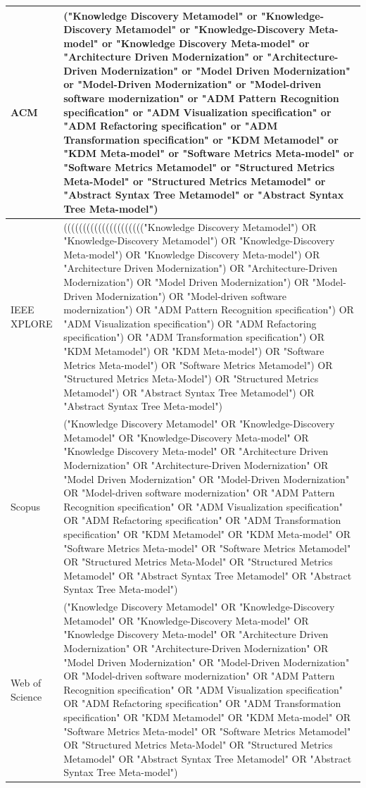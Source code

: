 \begin{longtable}[!tb]{ | m{2cm} | m{12cm}| }
 ACM & ("Knowledge Discovery Metamodel" or "Knowledge-Discovery Metamodel" or "Knowledge-Discovery Meta-model" or "Knowledge Discovery Meta-model" or "Architecture Driven Modernization" or "Architecture-Driven Modernization" or "Model Driven Modernization" or "Model-Driven Modernization" or "Model-driven software modernization" or "ADM Pattern Recognition specification" or "ADM Visualization specification" or "ADM Refactoring specification" or "ADM Transformation specification" or "KDM Metamodel" or "KDM Meta-model" or "Software Metrics Meta-model" or "Software Metrics Metamodel" or "Structured Metrics Meta-Model" or "Structured Metrics Metamodel" or "Abstract Syntax Tree Metamodel" or "Abstract Syntax Tree Meta-model")\\
 \hline
 IEEE XPLORE & ((((((((((((((((((((("Knowledge Discovery Metamodel") OR "Knowledge-Discovery Metamodel") OR "Knowledge-Discovery Meta-model") OR "Knowledge Discovery Meta-model") OR "Architecture Driven Modernization") OR "Architecture-Driven Modernization") OR "Model Driven Modernization") OR "Model-Driven Modernization") OR "Model-driven software modernization") OR "ADM Pattern Recognition specification") OR "ADM Visualization specification") OR "ADM Refactoring specification") OR "ADM Transformation specification") OR "KDM Metamodel") OR "KDM Meta-model") OR "Software Metrics Meta-model") OR "Software Metrics Metamodel") OR "Structured Metrics Meta-Model") OR "Structured Metrics Metamodel") OR "Abstract Syntax Tree Metamodel") OR "Abstract Syntax Tree Meta-model")\\
 \hline
 Scopus & ("Knowledge Discovery Metamodel"  OR  "Knowledge-Discovery Metamodel"  OR  "Knowledge-Discovery Meta-model"  OR  "Knowledge Discovery Meta-model"  OR  "Architecture Driven Modernization" OR  "Architecture-Driven Modernization"  OR  "Model Driven Modernization"  OR  "Model-Driven Modernization"  OR  "Model-driven software modernization"  OR  "ADM Pattern Recognition specification"  OR  "ADM Visualization specification"  OR  "ADM Refactoring specification"  OR  "ADM Transformation specification"  OR  "KDM Metamodel"  OR  "KDM Meta-model"  OR  "Software Metrics Meta-model"  OR  "Software Metrics Metamodel"  OR  "Structured Metrics Meta-Model"  OR  "Structured Metrics Metamodel"  OR  "Abstract Syntax Tree Metamodel"  OR  "Abstract Syntax Tree Meta-model")\\
 \hline
 Web of Science & ("Knowledge Discovery Metamodel" OR "Knowledge-Discovery Metamodel" OR "Knowledge-Discovery Meta-model" OR "Knowledge Discovery Meta-model" OR "Architecture Driven Modernization" OR "Architecture-Driven Modernization" OR "Model Driven Modernization" OR "Model-Driven Modernization" OR "Model-driven software modernization" OR "ADM Pattern Recognition specification" OR "ADM Visualization specification" OR "ADM Refactoring specification" OR "ADM Transformation specification" OR "KDM Metamodel" OR "KDM Meta-model" OR "Software Metrics Meta-model" OR "Software Metrics Metamodel" OR "Structured Metrics Meta-Model" OR "Structured Metrics Metamodel" OR "Abstract Syntax Tree Metamodel" OR "Abstract Syntax Tree Meta-model")\\

\end{longtable}
